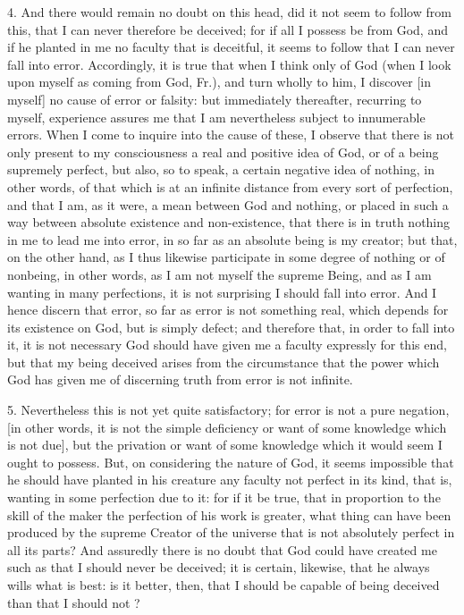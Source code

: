 4. And there would remain no doubt on this head, did it not seem to follow from this, that I can never therefore be deceived; for if all I possess be from God, and if he planted in me no faculty that is deceitful, it seems to follow that I can never fall into error. Accordingly, it is true that when I think only of God (when I look upon myself as coming from God, Fr.), and turn wholly to him, I discover [in myself] no cause of error or falsity: but immediately thereafter, recurring to myself, experience assures me that I am nevertheless subject to innumerable errors. When I come to inquire into the cause of these, I observe that there is not only present to my consciousness a real and positive idea of God, or of a being supremely perfect, but also, so to speak, a certain negative idea of nothing, in other words, of that which is at an infinite distance from every sort of perfection, and that I am, as it were, a mean between God and nothing, or placed in such a way between absolute existence and non-existence, that there is in truth nothing in me to lead me into error, in so far as an absolute being is my creator; but that, on the other hand, as I thus likewise participate in some degree of nothing or of nonbeing, in other words, as I am not myself the supreme Being, and as I am wanting in many perfections, it is not surprising I should fall into error. And I hence discern that error, so far as error is not something real, which depends for its existence on God, but is simply defect; and therefore that, in order to fall into it, it is not necessary God should have given me a faculty expressly for this end, but that my being deceived arises from the circumstance that the power which God has given me of discerning truth from error is not infinite.

5. Nevertheless this is not yet quite satisfactory; for error is not a pure negation, [in other words, it is not the simple deficiency or want of some knowledge which is not due], but the privation or want of some knowledge which it would seem I ought to possess. But, on considering the nature of God, it seems impossible that he should have planted in his creature any faculty not perfect in its kind, that is, wanting in some perfection due to it: for if it be true, that in proportion to the skill of the maker the perfection of his work is greater, what thing can have been produced by the supreme Creator of the universe that is not absolutely perfect in all its parts? And assuredly there is no doubt that God could have created me such as that I should never be deceived; it is certain, likewise, that he always wills what is best: is it better, then, that I should be capable of being deceived than that I should not ?

